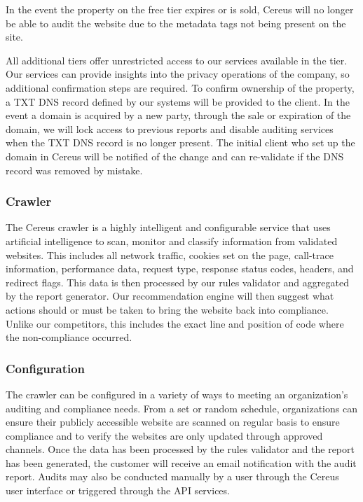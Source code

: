 In the event the property on the free tier expires or is sold, Cereus will no longer be able to audit the website due to the metadata tags not being present on the site. 


All additional tiers offer unrestricted access to our services available in the tier. Our services can provide insights into the privacy operations of the company, so additional confirmation steps are required. To confirm ownership of the property, a TXT DNS record defined by our systems will be provided to the client. In the event a domain is acquired by a new party, through the sale or expiration of the domain, we will lock access to previous reports and disable auditing services when the TXT DNS record is no longer present. The initial client who set up the domain in Cereus will be notified of the change and can re-validate if the DNS record was removed by mistake.

\subsubsection{Crawler}

The Cereus crawler is a highly intelligent and configurable service that uses artificial intelligence to scan, monitor and classify information from validated websites. This includes all network traffic, cookies set on the page, call-trace information, performance data, request type, response status codes, headers, and redirect flags. This data is then processed by our rules validator and aggregated by the report generator. Our recommendation engine will then suggest what actions should or must be taken to bring the website back into compliance. Unlike our competitors, this includes the exact line and position of code where the non-compliance occurred.

\subsubsection*{Configuration}

The crawler can be configured in a variety of ways to meeting an organization’s auditing and compliance needs. From a set or random schedule, organizations can ensure their publicly accessible website are scanned on regular basis to ensure compliance and to verify the websites are only updated through approved channels. Once the data has been processed by the rules validator and the report has been generated, the customer will receive an email notification with the audit report. Audits may also be conducted manually by a user through the Cereus user interface or triggered through the API services.

